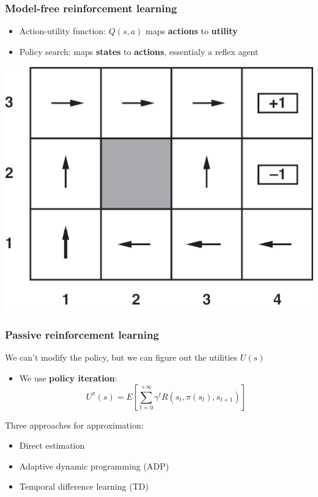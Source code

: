 \documentclass{beamer}
\begin{document}
\begin{frame}
	\frametitle{Model-free reinforcement learning}
	\begin{itemize}
		\item Action-utility function: $Q(s, a)$ maps \textbf{actions} to \textbf{utility}
		\item Policy search: maps \textbf{states} to \textbf{actions}, essentialy a reflex agent
	\end{itemize}
	\begin{center}
		\includegraphics[scale=0.8]{figures/optimal-policy-arrows.png}
	\end{center}
\end{frame}

\begin{frame}
	\frametitle{Passive reinforcement learning}
	We can't modify the policy, but we can figure out the utilities $U(s)$
	\begin{itemize}
		\item We use \textbf{policy iteration}:
			$$
				U^\pi(s) = E\left[ \sum_{t=0}^{+\infty} \gamma^t R(s_t, \pi(s_t), s_{t+1}) \right]
			$$
	\end{itemize}
	\pause
	Three approaches for approximation:
	\begin{itemize}
		\item Direct estimation
		\item Adaptive dynamic programming (ADP)
		\item Temporal difference learning (TD)
	\end{itemize}
\end{frame}
\end{document}
